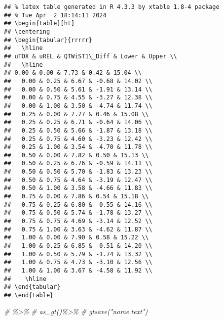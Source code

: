 \documentclass[
]{article}
\newenvironment{Shaded}{\begin{snugshade}}{\end{snugshade}}
\newcommand{\CommentTok}[1]{\textcolor[rgb]{0.56,0.35,0.01}{\textit{#1}}}
\begin{document}
\begin{verbatim}
## % latex table generated in R 4.3.3 by xtable 1.8-4 package
## % Tue Apr  2 18:14:11 2024
## \begin{table}[ht]
## \centering
## \begin{tabular}{rrrrr}
##   \hline
## uTOX & uREL & QTWiST1\_Diff & Lower & Upper \\ 
##   \hline
## 0.00 & 0.00 & 7.73 & 0.42 & 15.04 \\ 
##   0.00 & 0.25 & 6.67 & -0.68 & 14.02 \\ 
##   0.00 & 0.50 & 5.61 & -1.91 & 13.14 \\ 
##   0.00 & 0.75 & 4.55 & -3.27 & 12.38 \\ 
##   0.00 & 1.00 & 3.50 & -4.74 & 11.74 \\ 
##   0.25 & 0.00 & 7.77 & 0.46 & 15.08 \\ 
##   0.25 & 0.25 & 6.71 & -0.64 & 14.06 \\ 
##   0.25 & 0.50 & 5.66 & -1.87 & 13.18 \\ 
##   0.25 & 0.75 & 4.60 & -3.23 & 12.42 \\ 
##   0.25 & 1.00 & 3.54 & -4.70 & 11.78 \\ 
##   0.50 & 0.00 & 7.82 & 0.50 & 15.13 \\ 
##   0.50 & 0.25 & 6.76 & -0.59 & 14.11 \\ 
##   0.50 & 0.50 & 5.70 & -1.83 & 13.23 \\ 
##   0.50 & 0.75 & 4.64 & -3.19 & 12.47 \\ 
##   0.50 & 1.00 & 3.58 & -4.66 & 11.83 \\ 
##   0.75 & 0.00 & 7.86 & 0.54 & 15.18 \\ 
##   0.75 & 0.25 & 6.80 & -0.55 & 14.16 \\ 
##   0.75 & 0.50 & 5.74 & -1.78 & 13.27 \\ 
##   0.75 & 0.75 & 4.69 & -3.14 & 12.52 \\ 
##   0.75 & 1.00 & 3.63 & -4.62 & 11.87 \\ 
##   1.00 & 0.00 & 7.90 & 0.58 & 15.22 \\ 
##   1.00 & 0.25 & 6.85 & -0.51 & 14.20 \\ 
##   1.00 & 0.50 & 5.79 & -1.74 & 13.32 \\ 
##   1.00 & 0.75 & 4.73 & -3.10 & 12.56 \\ 
##   1.00 & 1.00 & 3.67 & -4.58 & 11.92 \\ 
##    \hline
## \end{tabular}
## \end{table}
\end{verbatim}

\begin{Shaded}
\begin{Highlighting}[]
\CommentTok{\# \%\textgreater{}\% }
\CommentTok{\#   as\_gt()\%\textgreater{}\% }
\CommentTok{\#   gtsave("name.text")}
\end{Highlighting}
\end{Shaded}
\end{document}
